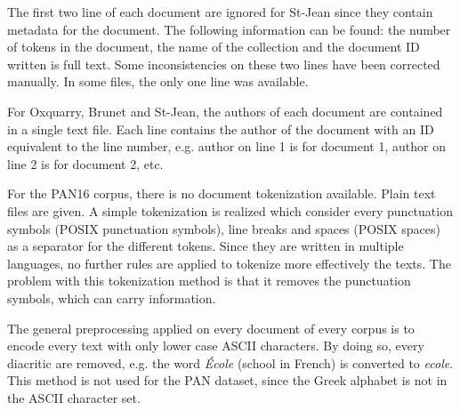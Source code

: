The first two line of each document are ignored for St-Jean since they contain metadata for the document.
The following information can be found: the number of tokens in the document, the name of the collection and the document ID written is full text.
Some inconsistencies on these two lines have been corrected manually.
In some files, the only one line was available.

For Oxquarry, Brunet and St-Jean, the authors of each document are contained in a single text file.
Each line contains the author of the document with an ID equivalent to the line number, e.g. author on line 1 is for document 1, author on line 2 is for document 2, etc.

For the PAN16 corpus, there is no document tokenization available.
Plain text files are given.
A simple tokenization is realized which consider every punctuation symbols (POSIX punctuation symbols), line breaks and spaces (POSIX spaces) as a separator for the different tokens.
Since they are written in multiple languages, no further rules are applied to tokenize more effectively the texts.
The problem with this tokenization method is that it removes the punctuation symbols, which can carry information.

The general preprocessing applied on every document of every corpus is to encode every text with only lower case ASCII characters.
By doing so, every diacritic are removed, e.g. the word \textit{École} (school in French) is converted to \textit{ecole}.
This method is not used for the PAN dataset, since the Greek alphabet is not in the ASCII character set.
